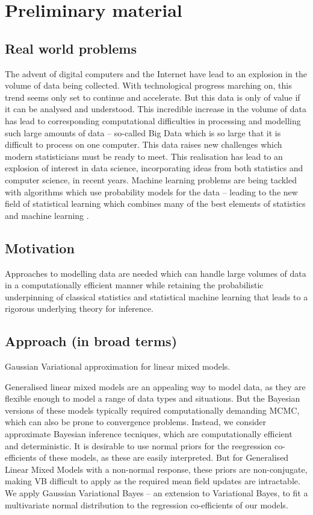 \chapter{Preliminary material}

\setlength{\parindent}{0pt}

\section{Real world problems}
The advent of digital computers and the Internet have lead to an explosion in the volume of data being
collected. With technological progress marching on, this trend seems only set to continue and accelerate. But
this data is only of value if it can be analysed and understood.  This incredible increase in the volume of
data has lead to corresponding computational difficulties in processing and modelling such large amounts of
data -- so-called Big Data which is so large that it is difficult to process on one computer. This data raises
new challenges which modern statisticians must be ready to meet. This realisation has lead to an explosion of
interest in data science, incorporating ideas from both statistics and computer science, in recent years.
Machine learning problems are being tackled with algorithms which use probability models for the data --
leading to the new field of statistical learning which combines many of the best elements of statistics and
machine  learning \cite{James:2014:ISL:2517747} \cite{MacKay:2002:ITI:971143}
\cite{hastie01statisticallearning} \cite{Murphy:2012:MLP:2380985}.

\section{Motivation}
Approaches to modelling data are needed which can handle large volumes of data in a computationally
efficient manner while retaining the probabilistic underpinning of classical statistics and statistical machine
learning that leads to a rigorous underlying theory for inference.

\section{Approach (in broad terms)}
Gaussian Variational approximation for linear mixed models.

Generalised linear mixed models are an appealing way to model data, as they are flexible enough to model a
range of data types and situations. But the Bayesian versions of these models typically required 
computationally demanding MCMC, which can also be prone to convergence problems. Instead, we consider approximate Bayesian inference tecniques, which are computationally efficient and deterministic. It is
desirable to use normal priors for the reegression co-efficients of these models, as these are easily
interpreted. But for Generalised Linear Mixed Models with a non-normal response, these priors are
non-conjugate, making VB difficult to apply as the required mean field updates are intractable. We apply
Gaussian Variational Bayes -- an extension to Variational Bayes, to fit a multivariate normal distribution
to the regression co-efficients of our models.


